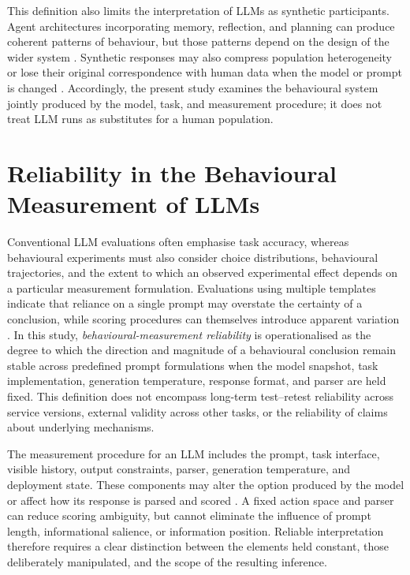 \documentclass[logo,msc]{infthesis}
\begin{document}
This definition also limits the interpretation of LLMs as synthetic participants. Agent architectures incorporating memory, reflection, and planning can produce coherent patterns of behaviour, but those patterns depend on the design of the wider system \cite{Park2023GenerativeAgents}. Synthetic responses may also compress population heterogeneity or lose their original correspondence with human data when the model or prompt is changed \cite{Dillion2023ReplaceParticipants,Bisbee2024SyntheticSurveyData}. Accordingly, the present study examines the behavioural system jointly produced by the model, task, and measurement procedure; it does not treat LLM runs as substitutes for a human population.

\section{Reliability in the Behavioural Measurement of LLMs}

Conventional LLM evaluations often emphasise task accuracy, whereas behavioural experiments must also consider choice distributions, behavioural trajectories, and the extent to which an observed experimental effect depends on a particular measurement formulation. Evaluations using multiple templates indicate that reliance on a single prompt may overstate the certainty of a conclusion, while scoring procedures can themselves introduce apparent variation \cite{Sclar2024PromptFormatting,Mizrahi2024MultiPrompt,Hua2025FlawArtifact}. In this study, \emph{behavioural-measurement reliability} is operationalised as the degree to which the direction and magnitude of a behavioural conclusion remain stable across predefined prompt formulations when the model snapshot, task implementation, generation temperature, response format, and parser are held fixed. This definition does not encompass long-term test--retest reliability across service versions, external validity across other tasks, or the reliability of claims about underlying mechanisms.

The measurement procedure for an LLM includes the prompt, task interface, visible history, output constraints, parser, generation temperature, and deployment state. These components may alter the option produced by the model or affect how its response is parsed and scored \cite{Webson2022PromptMeaning,Sclar2024PromptFormatting,Loya2023PromptSensitivityDecision,Chen2024ChatGPTBehavior,Hua2025FlawArtifact}. A fixed action space and parser can reduce scoring ambiguity, but cannot eliminate the influence of prompt length, informational salience, or information position. Reliable interpretation therefore requires a clear distinction between the elements held constant, those deliberately manipulated, and the scope of the resulting inference.
\end{document}
